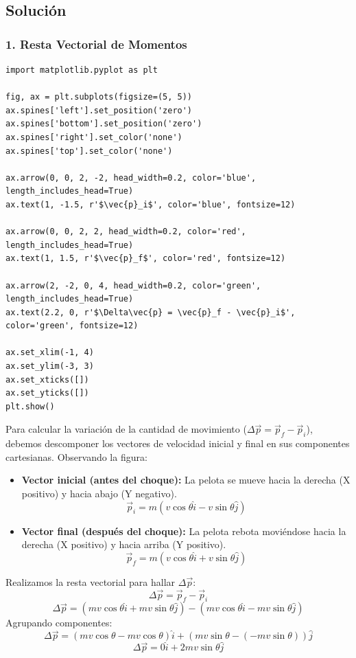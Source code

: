 \documentclass[12pt, a4paper]{article}
\begin{document}
\subsection*{Solución}

\subsubsection*{1. Resta Vectorial de Momentos}

\begin{verbatim}
import matplotlib.pyplot as plt

fig, ax = plt.subplots(figsize=(5, 5))
ax.spines['left'].set_position('zero')
ax.spines['bottom'].set_position('zero')
ax.spines['right'].set_color('none')
ax.spines['top'].set_color('none')

ax.arrow(0, 0, 2, -2, head_width=0.2, color='blue', length_includes_head=True)
ax.text(1, -1.5, r'$\vec{p}_i$', color='blue', fontsize=12)

ax.arrow(0, 0, 2, 2, head_width=0.2, color='red', length_includes_head=True)
ax.text(1, 1.5, r'$\vec{p}_f$', color='red', fontsize=12)

ax.arrow(2, -2, 0, 4, head_width=0.2, color='green', length_includes_head=True)
ax.text(2.2, 0, r'$\Delta\vec{p} = \vec{p}_f - \vec{p}_i$', color='green', fontsize=12)

ax.set_xlim(-1, 4)
ax.set_ylim(-3, 3)
ax.set_xticks([])
ax.set_yticks([])
plt.show()
\end{verbatim}

Para calcular la variación de la cantidad de movimiento ($\Delta\vec{p} = \vec{p}_f - \vec{p}_i$), debemos descomponer los vectores de velocidad inicial y final en sus componentes cartesianas.
Observando la figura:
\begin{itemize}
    \item \textbf{Vector inicial (antes del choque):} La pelota se mueve hacia la derecha (X positivo) y hacia abajo (Y negativo). 
    $$ \vec{p}_i = m(v \cos\theta \hat{i} - v \sin\theta \hat{j}) $$
    \item \textbf{Vector final (después del choque):} La pelota rebota moviéndose hacia la derecha (X positivo) y hacia arriba (Y positivo).
    $$ \vec{p}_f = m(v \cos\theta \hat{i} + v \sin\theta \hat{j}) $$
\end{itemize}

Realizamos la resta vectorial para hallar $\Delta\vec{p}$:
$$ \Delta\vec{p} = \vec{p}_f - \vec{p}_i $$
$$ \Delta\vec{p} = (mv \cos\theta \hat{i} + mv \sin\theta \hat{j}) - (mv \cos\theta \hat{i} - mv \sin\theta \hat{j}) $$
Agrupando componentes:
$$ \Delta\vec{p} = (mv \cos\theta - mv \cos\theta)\hat{i} + (mv \sin\theta - (-mv \sin\theta))\hat{j} $$
$$ \Delta\vec{p} = 0\hat{i} + 2mv \sin\theta\hat{j} $$
\end{document}
